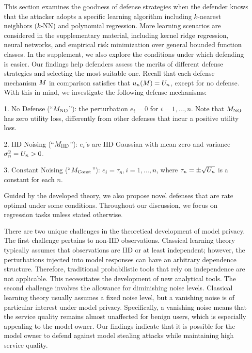 

    This section examines the goodness of defense strategies when the defender knows that the attacker adopts a specific learning algorithm including $k$-nearest neighbors ($k$-NN) and polynomial regression. More learning scenarios are considered in the supplementary material, including kernel ridge regression, neural networks, and empirical risk minimization over general bounded function classes. In the supplement, we also explore the conditions under which defending is easier.
    Our findings help defenders assess the merits of different defense strategies and selecting the most suitable one. 
    Recall that each defense mechanism $M$ in comparison satisfies that $u_n(M) = U_n$, except for no defense.
    With this in mind, we investigate the following defense mechanisms: 
    
    1. No Defense (``$M_{\textrm{NO}}$''): the perturbation $e_i=0$ for $i=1,\ldots, n$. Note that $M_{\textrm{NO}}$ has zero utility loss, differently from other defenses that incur a positive utility loss. 
    
    2. IID Noising (``$M_{\textrm{IID}}$''): $e_i$'s are IID Gaussian with mean zero and variance $\sigma^2_n = U_n > 0$. 
    
    3. Constant Noising (``$M_{\textrm{Const}}$''): $e_i=\tau_n, i=1,\ldots, n$, where $\tau_n=\pm \sqrt{U_n}$ is a constant for each $n$.

    Guided by the developed theory, we also propose novel defenses that are rate optimal under some conditions. Throughout our discussion, we focus on regression tasks unless stated otherwise. 

    There are two unique challenges in the theoretical development of model privacy. The first challenge pertains to non-IID observations. Classical learning theory typically assumes that observations are IID or at least independent; however, the perturbations injected into model responses can have an arbitrary dependence structure. Therefore, traditional probabilistic tools that rely on independence are not applicable. This necessitates the development of new analytical tools. 
    The second challenge involves the allowance for diminishing noise levels. Classical learning theory usually assumes a fixed noise level, but a vanishing noise is of particular interest under model privacy.
    Specifically, a vanishing noise means that the service quality remains almost unaffected for benign users, which is especially appealing to the model owner. Our findings indicate that it is possible for the model owner to defend against model stealing attacks while maintaining high service quality.

